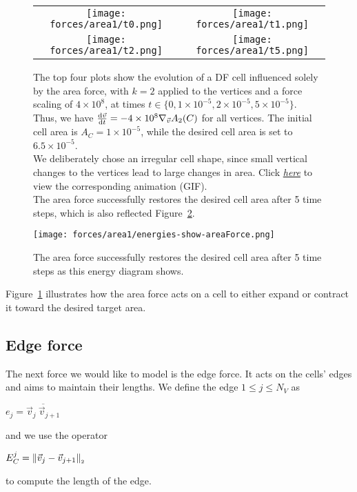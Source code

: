 \begin{figure}[h!]
    \centering
    \begin{tabular}{cc}
        \texttt{[image: forces/area1/t0.png]} &
        \texttt{[image: forces/area1/t1.png]} \\
        \texttt{[image: forces/area1/t2.png]} &
        \texttt{[image: forces/area1/t5.png]} \\
    \end{tabular}
    \caption{The top four plots show the evolution of a DF cell influenced solely by the area force, with $k=2$ applied to the vertices and a force scaling of $4\times 10^{8}$, at times $t \in \{0, 1\times 10^{-5}, 2\times 10^{-5}, 5\times 10^{-5}\}$.\\
	Thus, we have $\frac{\mathrm{d} \vec{v}}{\mathrm{d} t} = - 4\times 10^{8} \nabla_{\vec{v}} A_2(C)$ for all vertices.
	The initial cell area is $A_C = 1\times 10^{-5}$, while the desired cell area is set to $6.5\times 10^{-5}$.\\
	We deliberately chose an irregular cell shape, since small vertical changes to the vertices lead to large changes in area.
	Click \href{https://github.com/tivo476c/FlexibleCellModel/blob/master/figures/gifs/showForces/show-areaForce.gif}{\textit{here}} to view the corresponding animation (GIF).\\
	The area force successfully restores the desired cell area after 5 time steps, which is also reflected Figure~\ref{fig:areaEnergyDiagram}.}
	\label{fig:areaForce}    
\end{figure}
\begin{figure}[h!]
    \centering
        \texttt{[image: forces/area1/energies-show-areaForce.png]} 
    \caption{The area force successfully restores the desired cell area after 5 time steps as this energy diagram shows.}
	\label{fig:areaEnergyDiagram}    
\end{figure}
Figure~\ref{fig:areaForce} illustrates how the area force acts on a cell to either expand or contract it toward the desired target area.

    
\subsection{Edge force}
The next force we would like to model is the edge force. 
It acts on the cells' edges and aims to maintain their lengths.
We define the edge $1 \leq j \leq N_V$ as 
\begin{center}
	$
	e_j = \overline{\vec{v}_j \: \vec{v}_{j+1}}
	$
\end{center}
and we use the operator 
\begin{center}
	$
	E^j_C = \norm[\vec{v}_j - \vec{v}_{j+1}]
	$
\end{center}
to compute the length of the edge. 

